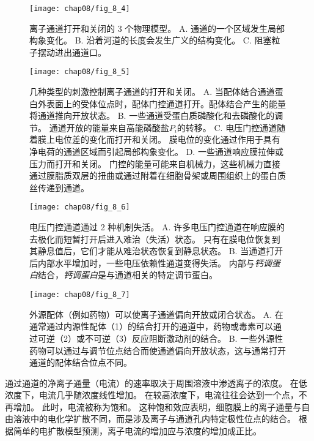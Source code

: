 \begin{figure}[htbp]
	\centering
	\texttt{[image: chap08/fig\_8\_4]}
	\caption{离子通道打开和关闭的 3 个物理模型。
		A. 通道的一个区域发生局部构象变化。
		B. 沿着河道的长度会发生广义的结构变化。
		C. 阻塞粒子摆动进出通道口。}
	\label{fig:8_4}
\end{figure}


\begin{figure}[htbp]
	\centering
	\texttt{[image: chap08/fig\_8\_5]}
	\caption{几种类型的刺激控制离子通道的打开和关闭。
		A. 当配体结合通道蛋白外表面上的受体位点时，配体门控通道打开。配体结合产生的能量将通道推向开放状态。
		B. 一些通道受蛋白质磷酸化和去磷酸化的调节。
		通道开放的能量来自高能磷酸盐$P_i$的转移。
		C. 电压门控通道随着膜上电位差的变化而打开和关闭。
		膜电位的变化通过作用于具有净电荷的通道区域而引起局部构象变化。
		D. 一些通道响应膜拉伸或压力而打开和关闭。
		门控的能量可能来自机械力，这些机械力直接通过膜脂质双层的扭曲或通过附着在细胞骨架或周围组织上的蛋白质丝传递到通道。}
	\label{fig:8_5}
\end{figure}


\begin{figure}[htbp]
	\centering
	\texttt{[image: chap08/fig\_8\_6]}
	\caption{电压门控通道通过 2 种机制失活。
		A. 许多电压门控通道在响应膜的去极化而短暂打开后进入难治（失活）状态。
		只有在膜电位恢复到其静息值后，它们才能从难治状态恢复到静息状态。
		B. 当通道打开后内部水平增加时，一些电压依赖性通道变得失活。
		内部与\textit{钙调蛋白}结合，\textit{钙调蛋白}是与通道相关的特定调节蛋白。}
	\label{fig:8_6}
\end{figure}


\begin{figure}[htbp]
	\centering
	\texttt{[image: chap08/fig\_8\_7]}
	\caption{外源配体（例如药物）可以使离子通道偏向开放或闭合状态。
		A. 在通常通过内源性配体（1）的结合打开的通道中，药物或毒素可以通过可逆（2）或不可逆（3）反应阻断激动剂的结合。
		B. 一些外源性药物可以通过与调节位点结合而使通道偏向开放状态，这与通常打开通道的配体结合位点不同。}
	\label{fig:8_7}
\end{figure}


通过通道的净离子通量（电流）的速率取决于周围溶液中渗透离子的浓度。
在低浓度下，电流几乎随浓度线性增加。
在较高浓度下，电流往往会达到一个点，不再增加。
此时，电流被称为饱和。
这种饱和效应表明，细胞膜上的离子通量与自由溶液中的电化学扩散不同，而是涉及离子与通道孔内特定极性位点的结合。
根据简单的电扩散模型预测，离子电流的增加应与浓度的增加成正比。


